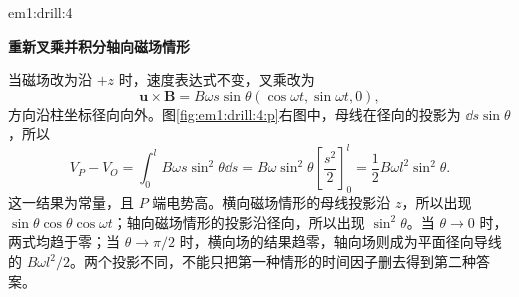 \begin{drillsolution}{em1:drill:4}
\par\medskip{}\noindent\textbf{重新叉乘并积分轴向磁场情形}\par\nobreak
当磁场改为沿 $+z$ 时，速度表达式不变，叉乘改为
\[\bm u\times\bm B=B\omega s\sin\theta(\cos\omega t,\sin\omega t,0),\]
方向沿柱坐标径向向外。图\ref{fig:em1:drill:4:p}右图中，母线在径向的投影为 $\dd s\sin\theta$，所以
\[V_P-V_O=\int_0^l B\omega s\sin^2\theta\dd s
=B\omega\sin^2\theta\left[\frac{s^2}{2}\right]_0^l
=\frac12B\omega l^2\sin^2\theta.\]
这一结果为常量，且 $P$ 端电势高。横向磁场情形的母线投影沿 $z$，所以出现 $\sin\theta\cos\theta\cos\omega t$；轴向磁场情形的投影沿径向，所以出现 $\sin^2\theta$。当 $\theta\to0$ 时，两式均趋于零；当 $\theta\to\pi/2$ 时，横向场的结果趋零，轴向场则成为平面径向导线的 $B\omega l^2/2$。两个投影不同，不能只把第一种情形的时间因子删去得到第二种答案。\end{drillsolution}
